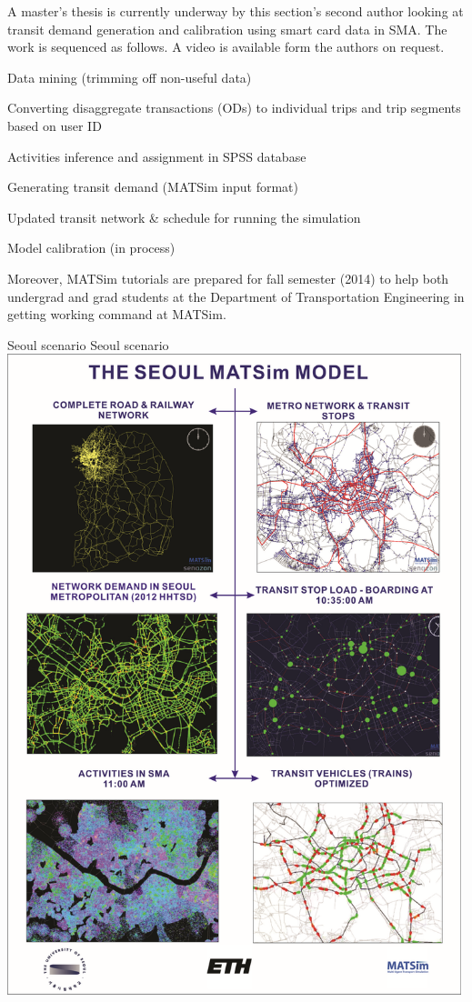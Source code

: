 A master's thesis is currently underway by this section's second author looking at transit demand generation and calibration using smart card data in SMA. The work is sequenced as follows. A video is available form the authors on request.
%
\begin{compactitem}
\item Data mining (trimming off non-useful data)
\item	Converting disaggregate transactions (ODs) to individual trips and trip segments based on user ID
\item	Activities inference and assignment in SPSS database
\item	Generating transit demand (MATSim input format)
\item	Updated transit network \& schedule for running the simulation
\item	Model calibration (in process)
\end{compactitem}
%
Moreover, MATSim tutorials are prepared for fall semester (2014) to help both undergrad and grad students at the Department of Transportation Engineering in getting working command at MATSim.

\createfigure%
{Seoul scenario}%
{Seoul scenario}%
{\label{fig:seoul}}%
{\includegraphics[width=0.99\textwidth, angle=0]{using/figures/seoul}}%
{}

 
 
